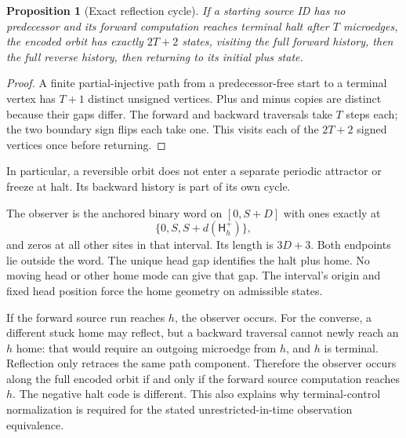 \documentclass[11pt,a4paper]{article}
\numberwithin{equation}{section}
\newtheorem{proposition}[theorem]{Proposition}
\newcommand{\Hh}{\mathsf H}\newcommand{\Oo}{\mathsf O}\newcommand{\Ii}{\mathsf I}\newcommand{\HH}{\mathsf H}
\begin{document}
\begin{proposition}[Exact reflection cycle]\label{fpa:prop:cycle}
If a starting source ID has no predecessor and its forward computation reaches
terminal halt after $T$ microedges, the encoded orbit has exactly $2T+2$
states, visiting the full forward history, then the full reverse history, then
returning to its initial plus state.
\end{proposition}
\begin{proof}
A finite partial-injective path from a predecessor-free start to a terminal
vertex has $T+1$ distinct unsigned vertices. Plus and minus copies are distinct
because their gaps differ. The forward and backward traversals take $T$ steps
each; the two boundary sign flips each take one. This visits each of the
$2T+2$ signed vertices once before returning.
\end{proof}

In particular, a reversible orbit does not enter a separate periodic attractor
or freeze at halt. Its backward history is part of its own cycle.

The observer is the anchored binary word on $[0,S+D]$ with ones exactly at
\[
                 \{0,S,S+d(\Hh_h^+)\},              \tag{17}\label{fpa:eq:observer}
\]
and zeros at all other sites in that interval. Its length is $3D+3$. Both
endpoints lie outside the word. The unique head gap identifies the halt plus
home. No moving head or other home mode can give that gap. The interval's
origin and fixed head position force the home geometry on admissible states.

If the forward source run reaches $h$, the observer occurs. For the converse,
a different stuck home may reflect, but a backward traversal cannot newly
reach an $h$ home: that would require an outgoing microedge from $h$, and
$h$ is terminal. Reflection only retraces the same path component. Therefore
the observer occurs along the full encoded orbit if and only if the forward
source computation reaches $h$. The negative halt code is different. This
also explains why terminal-control normalization is required for the stated
unrestricted-in-time observation equivalence.
\end{document}
